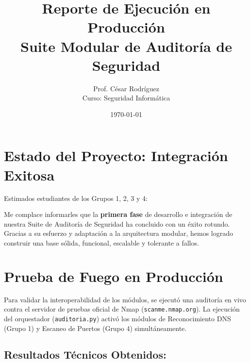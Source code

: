 \documentclass[12pt,a4paper]{article}
\title{Reporte de Ejecución en Producción \\ \large Suite Modular de Auditoría de Seguridad}
\author{Prof. César Rodríguez \\ \small Curso: Seguridad Informática}
\date{\today}
\begin{document}
\maketitle

\section*{Estado del Proyecto: \textcolor{green!70!black}{Integración Exitosa}}

Estimados estudiantes de los Grupos 1, 2, 3 y 4:

Me complace informarles que la \textbf{primera fase} de desarrollo e integración de nuestra Suite de Auditoría de Seguridad ha concluido con un éxito rotundo. Gracias a su esfuerzo y adaptación a la arquitectura modular, hemos logrado construir una base sólida, funcional, escalable y tolerante a fallos.

\section*{Prueba de Fuego en Producción}

Para validar la interoperabilidad de los módulos, se ejecutó una auditoría en vivo contra el servidor de pruebas oficial de Nmap (\texttt{scanme.nmap.org}). La ejecución del orquestador (\texttt{auditoria.py}) activó los módulos de Reconocimiento DNS (Grupo 1) y Escaneo de Puertos (Grupo 4) simultáneamente.

\subsection*{Resultados Técnicos Obtenidos:}
\end{document}
